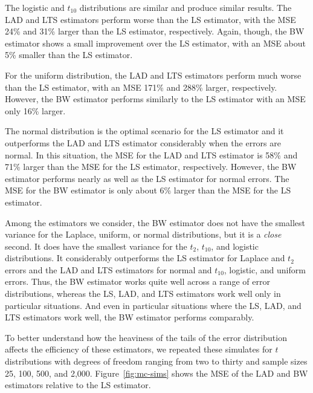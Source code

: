 \documentclass[12pt]{article}
\begin{document}
The logistic and $t_{10}$ distributions are similar and produce similar results. The LAD and LTS estimators perform worse than the LS estimator, with the MSE 24\% and 31\% larger than the LS estimator, respectively. Again, though, the BW estimator shows a small improvement over the LS estimator, with an MSE about 5\% smaller than the LS estimator. 

For the uniform distribution, the LAD and LTS estimators perform much worse than the LS estimator, with an MSE 171\% and 288\% larger, respectively. However, the BW estimator performs similarly to the LS estimator with an MSE only 16\% larger.

The normal distribution is the optimal scenario for the LS estimator and it outperforms the LAD and LTS estimator considerably when the errors are normal. 
In this situation, the MSE for the LAD and LTS estimator is 58\% and 71\% larger than the MSE for the LS estimator, respectively. 
However, the BW estimator performs nearly as well as the LS estimator for normal errors. 
The MSE for the BW estimator is only about 6\% larger than the MSE for the LS estimator.

Among the estimators we consider, the BW estimator does not have the smallest variance for the Laplace, uniform, or normal distributions, but it is a \textit{close} second. 
It does have the smallest variance for the $t_2$, $t_{10}$, and logistic distributions. 
It considerably outperforms the LS estimator for Laplace and $t_2$ errors and the LAD and LTS estimators for normal and $t_{10}$, logistic, and uniform errors. 
Thus, the BW estimator works quite well across a range of error distributions, whereas the LS, LAD, and LTS estimators work well only in particular situations. 
And even in particular situations where the LS, LAD, and LTS estimators work well, the BW estimator performs comparably.

To better understand how the heaviness of the tails of the error distribution affects the efficiency of these estimators, we repeated these simulates for $t$ distributions with degrees of freedom ranging from two to thirty and sample sizes 25, 100, 500, and 2,000. Figure~\ref{fig:mc-sims} shows the MSE of the LAD and BW estimators relative to the LS estimator.
\end{document}
